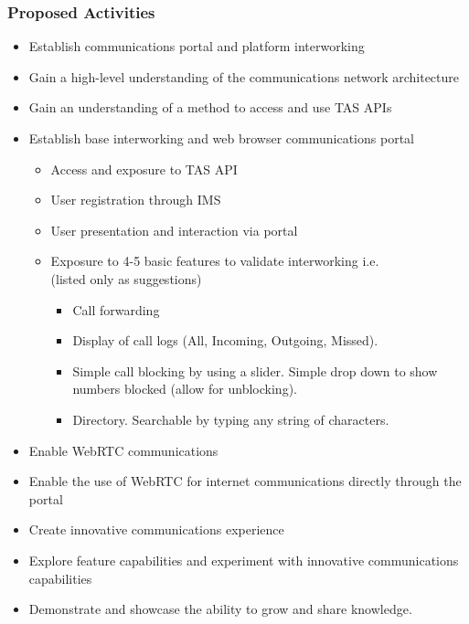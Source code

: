 \documentclass[12pt]{article}
\begin{document}
\newpage
\begin{spacing}{1.5} %
	\subsubsection{Proposed Activities}
	\begin{itemize}
		\item
		Establish communications portal and platform interworking
		\item
		Gain a high-level understanding of the communications network architecture
		\item
		Gain an understanding of a method to access and use TAS APIs
		\item
		Establish base interworking and web browser communications portal
	\begin{itemize}
		\item
		Access and exposure to TAS API
		\item
		User registration through IMS
		\item
		User presentation and interaction via portal
		\item
		Exposure to 4-5 basic features to validate interworking i.e. \\ 
		(listed only as suggestions)
	\begin{itemize}
		\item
		Call forwarding
		\item
		Display of call logs (All, Incoming, Outgoing, Missed).
		\item
		Simple call blocking by using a slider.  Simple drop down to show numbers blocked (allow
		for unblocking).
		\item
		Directory.  Searchable by typing any string of characters.
		\end{itemize}
		\end{itemize}
		\item
		Enable WebRTC communications
		\item
		Enable the use of WebRTC for internet communications directly through the portal
		
		\item
		Create innovative communications experience
		\item
		Explore feature capabilities and experiment with innovative communications capabilities
		\item
		Demonstrate and showcase the ability to grow and share knowledge.	
	\end{itemize}




\end{spacing}
\end{document}
